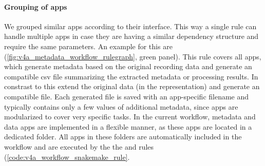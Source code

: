 \paragraph{Grouping of apps}
We grouped similar apps according to their interface. This way a single rule can handle multiple apps in case they are having a similar dependency structure and require the same parameters. An example for this are (\cref{fig:v4a_metadata_workflow_rulegraph}, green panel). This rule covers all apps, which generate metadata based on the original recording data and generate an  compatible csv file summarizing the extracted metadata or processing results. In constrast to this  extend the original data (in the  representation) and generate an  compatible  file. Each generated  file is saved with an app-specific filename and typically contains only a few values of additional metadata, since apps are modularized to cover very specific tasks.
In the current workflow, metadata and data apps are implemented in a flexible manner, as these apps are located in a dedicated folder. All apps in these folders are automatically included in the workflow and are executed by the the  and  rules (\cref{code:v4a_workflow_snakemake_rule}.

